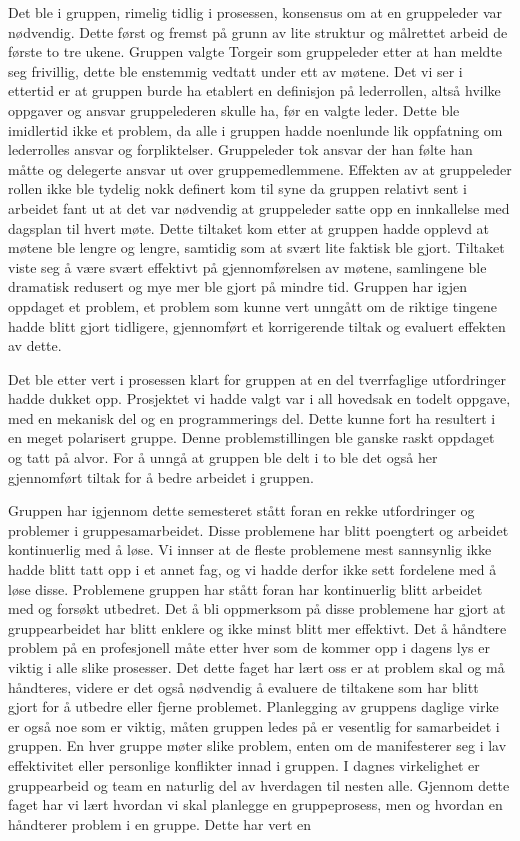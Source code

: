 Det ble i gruppen, rimelig tidlig i prosessen, konsensus om at en gruppeleder var nødvendig.
Dette først og fremst på grunn av lite struktur og målrettet arbeid de første to tre ukene.
Gruppen valgte Torgeir som gruppeleder etter at han meldte seg frivillig, dette ble enstemmig vedtatt under ett av møtene.
Det vi ser i ettertid er at gruppen burde ha etablert en definisjon på lederrollen, altså hvilke oppgaver og ansvar gruppelederen skulle ha, før en valgte leder.
Dette ble imidlertid ikke et problem, da alle i gruppen hadde noenlunde lik oppfatning om lederrolles ansvar og forpliktelser.
Gruppeleder tok ansvar der han følte han måtte og delegerte ansvar ut over gruppemedlemmene.
Effekten av at gruppeleder rollen ikke ble tydelig nokk definert kom til syne da gruppen relativt sent i arbeidet fant ut at det var nødvendig at gruppeleder satte opp en innkallelse med dagsplan til hvert møte.
Dette tiltaket kom etter at gruppen hadde opplevd at møtene ble lengre og lengre, samtidig som at svært lite faktisk ble gjort.
Tiltaket viste seg å være svært effektivt på gjennomførelsen av møtene, samlingene ble dramatisk redusert og mye mer ble gjort på mindre tid.
Gruppen har igjen oppdaget et problem, et problem som kunne vert unngått om de riktige tingene hadde blitt gjort tidligere, gjennomført et korrigerende tiltak og evaluert effekten av dette.

Det ble etter vert i prosessen klart for gruppen at en del tverrfaglige utfordringer hadde dukket opp.
Prosjektet vi hadde valgt var i all hovedsak en todelt oppgave, med en mekanisk del og en programmerings del.
Dette kunne fort ha resultert i en meget polarisert gruppe.
Denne problemstillingen ble ganske raskt oppdaget og tatt på alvor.
For å unngå at gruppen ble delt i to ble det også her gjennomført tiltak for å bedre arbeidet i gruppen.

Gruppen har igjennom dette semesteret stått foran en rekke utfordringer og problemer i gruppesamarbeidet.
Disse problemene har blitt poengtert og arbeidet kontinuerlig med å løse.
Vi innser at de fleste problemene mest sannsynlig ikke hadde blitt tatt opp i et annet fag, og vi hadde derfor ikke sett fordelene med å løse disse.
Problemene gruppen har stått foran har kontinuerlig blitt arbeidet med og forsøkt utbedret.
Det å bli oppmerksom på disse problemene har gjort at gruppearbeidet har blitt enklere og ikke minst blitt mer effektivt.
Det å håndtere problem på en profesjonell måte etter hver som de kommer opp i dagens lys er viktig i alle slike prosesser.
Det dette faget har lært oss er at problem skal og må håndteres, videre er det også nødvendig å evaluere de tiltakene som har blitt gjort for å utbedre eller fjerne problemet.
Planlegging av gruppens daglige virke er også noe som er viktig, måten gruppen ledes på er vesentlig for samarbeidet i gruppen.
En hver gruppe møter slike problem, enten om de manifesterer seg i lav effektivitet eller personlige konflikter innad i gruppen.
I dagnes virkelighet er gruppearbeid og team en naturlig del av hverdagen til nesten alle.
Gjennom dette faget har vi lært hvordan vi skal planlegge en gruppeprosess, men og hvordan en håndterer problem i en gruppe.
Dette har vert en   
